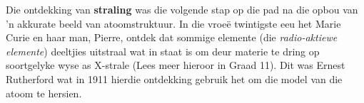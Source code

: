   
Die ontdekking van \textbf{straling} was die volgende stap op die pad na die opbou van 'n akkurate beeld van atoomstruktuur. In die vroe\"{e} twintigste eeu het Marie Curie en haar man, Pierre, ontdek dat sommige elemente (die \textsl{radio-aktiewe elemente}) deeltjies uitstraal wat in staat is om deur materie te dring op soortgelyke wyse as X-strale (Lees meer hieroor in Graad 11). Dit was Ernest Rutherford wat in 1911 hierdie ontdekking gebruik het om die model van die atoom te hersien.\par 
      

      
